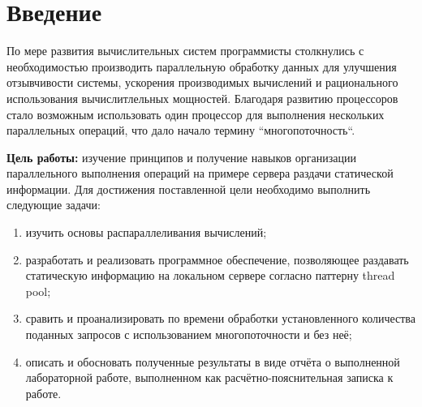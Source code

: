 \chapter*{Введение}

По мере развития вычислительных систем программисты столкнулись с необходимостью производить параллельную обработку данных для улучшения отзывчивости системы, ускорения производимых вычислений и рационального использования вычислитлельных мощностей. Благодаря развитию процессоров стало возможным использовать один процессор для выполнения нескольких параллельных операций, что дало начало термину ``многопоточность``.

\textbf{Цель работы:} изучение принципов и получение навыков организации  параллельного выполнения операций на примере сервера раздачи статической информации. Для достижения поставленной цели необходимо выполнить следующие задачи:
\begin{enumerate}[label=\arabic*)]
	\item изучить основы распараллеливания вычислений;
	\item разработать и реализовать программное обеспечение, позволяющее раздавать статическую информацию на локальном сервере согласно паттерну thread pool;
	\item сравить и проанализировать по времени обработки установленного количества поданных запросов с использованием многопоточности и без неё;
	\item описать и обосновать полученные результаты в виде отчёта о выполненной лабораторной работе, выполненном как расчётно-пояснительная записка к работе.
\end{enumerate}